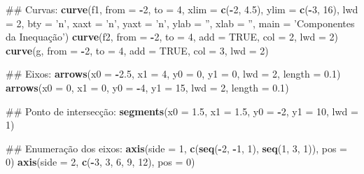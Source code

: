 \documentclass[]{book}
\newenvironment{Shaded}{\begin{snugshade}}{\end{snugshade}}
\newcommand{\KeywordTok}[1]{\textcolor[rgb]{0.13,0.29,0.53}{\textbf{#1}}}
\newcommand{\DataTypeTok}[1]{\textcolor[rgb]{0.13,0.29,0.53}{#1}}
\newcommand{\DecValTok}[1]{\textcolor[rgb]{0.00,0.00,0.81}{#1}}
\newcommand{\FloatTok}[1]{\textcolor[rgb]{0.00,0.00,0.81}{#1}}
\newcommand{\StringTok}[1]{\textcolor[rgb]{0.31,0.60,0.02}{#1}}
\newcommand{\OtherTok}[1]{\textcolor[rgb]{0.56,0.35,0.01}{#1}}
\newcommand{\OperatorTok}[1]{\textcolor[rgb]{0.81,0.36,0.00}{\textbf{#1}}}
\newcommand{\NormalTok}[1]{#1}
\begin{document}
\begin{enumerate}
\begin{Shaded}
\begin{Highlighting}[]
\NormalTok{##  Curvas:}
\KeywordTok{curve}\NormalTok{(f1, }\DataTypeTok{from =} \OperatorTok{-}\DecValTok{2}\NormalTok{, }\DataTypeTok{to =} \DecValTok{4}\NormalTok{, }\DataTypeTok{xlim =} \KeywordTok{c}\NormalTok{(}\OperatorTok{-}\DecValTok{2}\NormalTok{, }\FloatTok{4.5}\NormalTok{), }\DataTypeTok{ylim =} \KeywordTok{c}\NormalTok{(}\OperatorTok{-}\DecValTok{3}\NormalTok{, }\DecValTok{16}\NormalTok{), }\DataTypeTok{lwd =} \DecValTok{2}\NormalTok{,}
  \DataTypeTok{bty =} \StringTok{'n'}\NormalTok{, }\DataTypeTok{xaxt =} \StringTok{'n'}\NormalTok{, }\DataTypeTok{yaxt =} \StringTok{'n'}\NormalTok{, }\DataTypeTok{ylab =} \StringTok{''}\NormalTok{, }\DataTypeTok{xlab =} \StringTok{''}\NormalTok{,}
  \DataTypeTok{main =} \StringTok{'Componentes da Inequação'}\NormalTok{)}
\KeywordTok{curve}\NormalTok{(f2, }\DataTypeTok{from =} \OperatorTok{-}\DecValTok{2}\NormalTok{, }\DataTypeTok{to =} \DecValTok{4}\NormalTok{, }\DataTypeTok{add =} \OtherTok{TRUE}\NormalTok{, }\DataTypeTok{col =} \DecValTok{2}\NormalTok{, }\DataTypeTok{lwd =} \DecValTok{2}\NormalTok{)}
\KeywordTok{curve}\NormalTok{(g, }\DataTypeTok{from =} \OperatorTok{-}\DecValTok{2}\NormalTok{, }\DataTypeTok{to =} \DecValTok{4}\NormalTok{, }\DataTypeTok{add =} \OtherTok{TRUE}\NormalTok{, }\DataTypeTok{col =} \DecValTok{3}\NormalTok{, }\DataTypeTok{lwd =} \DecValTok{2}\NormalTok{)}

\NormalTok{##  Eixos:}
\KeywordTok{arrows}\NormalTok{(}\DataTypeTok{x0 =} \OperatorTok{-}\FloatTok{2.5}\NormalTok{, }\DataTypeTok{x1 =} \DecValTok{4}\NormalTok{,}
   \DataTypeTok{y0 =} \DecValTok{0}\NormalTok{, }\DataTypeTok{y1 =} \DecValTok{0}\NormalTok{, }\DataTypeTok{lwd =} \DecValTok{2}\NormalTok{, }\DataTypeTok{length =} \FloatTok{0.1}\NormalTok{)}
\KeywordTok{arrows}\NormalTok{(}\DataTypeTok{x0 =} \DecValTok{0}\NormalTok{, }\DataTypeTok{x1 =} \DecValTok{0}\NormalTok{,}
   \DataTypeTok{y0 =} \OperatorTok{-}\DecValTok{4}\NormalTok{, }\DataTypeTok{y1 =} \DecValTok{15}\NormalTok{, }\DataTypeTok{lwd =} \DecValTok{2}\NormalTok{, }\DataTypeTok{length =} \FloatTok{0.1}\NormalTok{)}

\NormalTok{##  Ponto de intersecção:}
\KeywordTok{segments}\NormalTok{(}\DataTypeTok{x0 =} \FloatTok{1.5}\NormalTok{, }\DataTypeTok{x1 =} \FloatTok{1.5}\NormalTok{,}
     \DataTypeTok{y0 =} \OperatorTok{-}\DecValTok{2}\NormalTok{, }\DataTypeTok{y1 =} \DecValTok{10}\NormalTok{, }\DataTypeTok{lwd =} \DecValTok{1}\NormalTok{)}

\NormalTok{##  Enumeração dos eixos:}
\KeywordTok{axis}\NormalTok{(}\DataTypeTok{side =} \DecValTok{1}\NormalTok{, }\KeywordTok{c}\NormalTok{(}\KeywordTok{seq}\NormalTok{(}\OperatorTok{-}\DecValTok{2}\NormalTok{, }\OperatorTok{-}\DecValTok{1}\NormalTok{, }\DecValTok{1}\NormalTok{), }\KeywordTok{seq}\NormalTok{(}\DecValTok{1}\NormalTok{, }\DecValTok{3}\NormalTok{, }\DecValTok{1}\NormalTok{)), }\DataTypeTok{pos =} \DecValTok{0}\NormalTok{)}
\KeywordTok{axis}\NormalTok{(}\DataTypeTok{side =} \DecValTok{2}\NormalTok{, }\KeywordTok{c}\NormalTok{(}\OperatorTok{-}\DecValTok{3}\NormalTok{, }\DecValTok{3}\NormalTok{, }\DecValTok{6}\NormalTok{, }\DecValTok{9}\NormalTok{, }\DecValTok{12}\NormalTok{), }\DataTypeTok{pos =} \DecValTok{0}\NormalTok{)}


\end{Highlighting}
\end{Shaded}
\end{enumerate}
\end{document}
